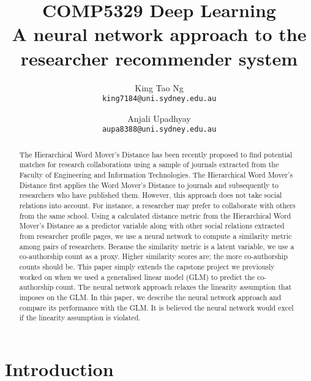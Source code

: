 \documentclass[a4paper,11pt]{article}
\begin{document}
\title{
	\textbf{COMP5329 Deep Learning}\\[0.5cm]
	\textbf{A neural network approach to the researcher recommender system}
}

\author{
	King Tao Ng\\
	\texttt{king7184@uni.sydney.edu.au}\\
	\and
	Anjali Upadhyay\\
	\texttt{aupa8388@uni.sydney.edu.au}\\
}

\maketitle %
 
\begin{abstract}
	
	The Hierarchical Word Mover’s Distance has been recently proposed to find potential matches for research collaborations using a sample of journals extracted from the Faculty of Engineering and Information Technologies. The Hierarchical Word Mover’s Distance first applies the Word Mover’s Distance to journals and subsequently to researchers who have published them. However, this approach does not take social relations into account. For instance, a researcher may prefer to collaborate with others from the same school. Using a calculated distance metric from the Hierarchical Word Mover’s Distance as a predictor variable along with other social relations extracted from researcher profile pages, we use a neural network to compute a similarity metric among pairs of researchers. Because the similarity metric is a latent variable, we use a co-authorship count as a proxy. Higher similarity scores are; the more co-authorship counts should be. This paper simply extends the capstone project we previously worked on when we used a generalised linear model (GLM) to predict the co-authorship count. The neural network approach relaxes the linearity assumption that imposes on the GLM. In this paper, we describe the neural network approach and compare its performance with the GLM. It is believed the neural network would excel if the linearity assumption is violated.
	
\end{abstract}
 
\section{Introduction}
\end{document}
